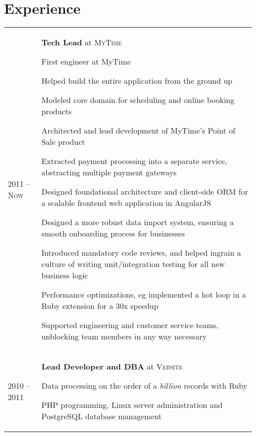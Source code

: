 \documentclass[a4paper,10pt]{article}
\newenvironment{packed-list}{
  \vspace{2pt}
  \begin{itemize}[itemsep=1pt,partopsep=0pt,leftmargin=1.5em]
    \setlength{\parskip}{0pt}
    \setlength{\partopsep}{9pt}
    \setlength{\parsep}{0pt}
    \setlength{\topsep}{0pt}
} {\end{itemize}}
\begin{document}
\section{Experience}
\begin{tabular}{p{}p{}}
  \textsc{2011 – Now}
    & \textbf{Tech Lead} at \textsc{MyTime}
    \begin{packed-list}
      \item{ First engineer at MyTime }
      \item{ Helped build the entire application from the ground up }
      \item{ Modeled core domain for scheduling and online booking products }
      \item{ Architected and lead development of MyTime's Point of Sale product }
      \item{ Extracted payment processing into a separate service, abstracting multiple payment gateways }
      \item{ Designed foundational architecture and client-side ORM for a scalable frontend web application in AngularJS }
      \item{ Designed a more robust data import system, ensuring a smooth onboarding process for businesses }
      \item{ Introduced mandatory code reviews, and helped ingrain a culture of writing unit/integration testing for all new business logic }
      \item{ Performance optimizations, eg implemented a hot loop in a Ruby extension for a 30x speedup }
      \item{ Supported engineering and customer service teams, unblocking team members in any way necessary }
    \end{packed-list}
    \vspace{-5pt}
    \\
  \textsc{2010 – 2011}
    & \textbf{Lead Developer and DBA} at \textsc{Vebsite}
    \begin{packed-list}
      \item{Data processing on the order of a {\em billion} records with Ruby}
      \item{PHP programming, Linux server administration and PostgreSQL database management}
    \end{packed-list}
\end{tabular}
\vspace{-15pt}
\end{document}
